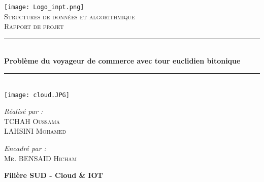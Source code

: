 \documentclass[12pt, openany]{report}
\newcommand{\HRule}{\rule{\linewidth}{0.5mm}}
\begin{document}
\begin{titlepage}
  \begin{sffamily}
  \begin{center}

    \texttt{[image: Logo\_inpt.png]}~\\[1cm]

    \textsc{\LARGE Structures de données et algorithmique}\\[1cm]

    \textsc{\huge Rapport de projet}\\[1cm]

    \HRule \\[0.4cm]
    { \huge \bfseries Problème du voyageur de commerce avec tour euclidien bitonique\\[0.4cm] }

    \HRule \\[1cm]
    \texttt{[image: cloud.JPG]}
    \\[2cm]

    \begin{minipage}{0.4\textwidth}
      \begin{flushleft} \large
        \emph{Réalisé par : } \textsc{\\TCHAH Oussama \\ LAHSINI Mohamed}
      \end{flushleft}
    \end{minipage}
    \begin{minipage}{0.4\textwidth}
      \begin{flushright} \large
        \emph{Encadré par :} \textsc{\\Mr. BENSAID Hicham}\\

      \end{flushright}
    \end{minipage}

    \vfill

    {\large \textbf{Filière SUD - Cloud \& IOT}}

  \end{center}
  \end{sffamily}
\end{titlepage}
\newpage
\tableofcontents
\newpage
\end{document}
